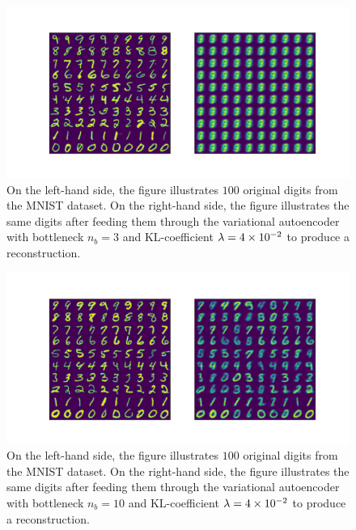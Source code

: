 \begin{figure}
\begin{center}
      \includegraphics[trim = 15mm 10mm 15mm 15mm, clip, width=\linewidth]{convolutional_VAE_snd_KL_4e-2_5k_epochs_3D_inference}
\end{center}
\caption{On the left-hand side, the figure illustrates $100$ original digits from the MNIST dataset. On the right-hand side, the figure illustrates the same digits after feeding them through the variational autoencoder with bottleneck $n_b=3$ and KL-coefficient $\lambda=\num{4e-2}$ to produce a reconstruction.}\label{fig:convolutional_VAE_snd_KL_4e-2_5k_epochs_3D_inference}
\end{figure}


\begin{figure}
\begin{center}
      \includegraphics[trim = 15mm 10mm 15mm 15mm, clip, width=\linewidth]{convolutional_VAE_snd_KL_4e-2_10k_epochs_10D_inference}
\end{center}
\caption{On the left-hand side, the figure illustrates $100$ original digits from the MNIST dataset. On the right-hand side, the figure illustrates the same digits after feeding them through the variational autoencoder with bottleneck $n_b=10$ and KL-coefficient $\lambda=\num{4e-2}$ to produce a reconstruction.}\label{fig:convolutional_VAE_snd_KL_4e-2_10k_epochs_10D_inference}
\end{figure}


